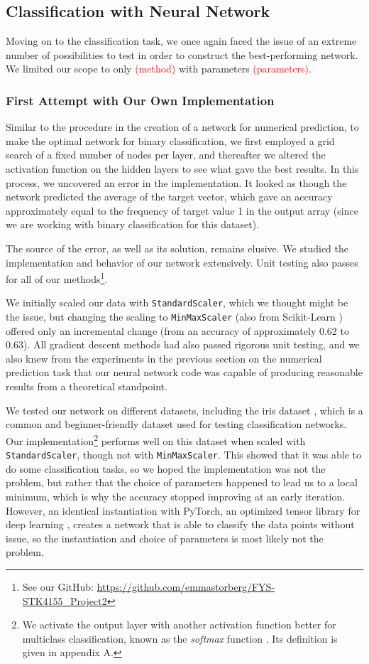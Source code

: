 \subsection{Classification with Neural Network}
Moving on to the classification task, we once again faced the issue of an extreme number of possibilities to test in order to construct the best-performing network. We limited our scope to only \textcolor{red}{(method)} with parameters \textcolor{red}{(parameters)}.

\subsubsection{First Attempt with Our Own Implementation}
Similar to the procedure in the creation of a network for numerical prediction, to make the optimal network for binary classification, we first employed a grid search of a fixed number of nodes per layer, and thereafter we altered the activation function on the hidden layers to see what gave the best results. In this process, we uncovered an error in the implementation. It looked as though the network predicted the average of the target vector, which gave an accuracy approximately equal to the frequency of target value 1 in the output array (since we are working with binary classification for this dataset). 

The source of the error, as well as its solution, remains elusive. We studied the implementation and behavior of our network extensively. Unit testing also passes for all of our methods\footnote{See our GitHub: \url{https://github.com/emmastorberg/FYS-STK4155_Project2}}.  

We initially scaled our data with \texttt{StandardScaler}, which we thought might be the issue, but changing the scaling to \texttt{MinMaxScaler} (also from Scikit-Learn \cite{sklearnScaling}) offered only an incremental change (from an accuracy of approximately 0.62 to 0.63). All gradient descent methods had also passed rigorous unit testing, and we also knew from the experiments in the previous section on the numerical prediction task that our neural network code was capable of producing reasonable results from a theoretical standpoint. 

We tested our network on different datasets, including the iris dataset \cite{irisdataset}, which is a common and beginner-friendly dataset used for testing classification networks. Our implementation\footnote{We activate the output layer with another activation function better for multiclass classification, known as the \emph{softmax} function \cite{softmax}. Its definition is given in appendix A.} performs well on this dataset when scaled with \texttt{StandardScaler}, though not with \texttt{MinMaxScaler}. This showed that it was able to do some classification tasks, so we hoped the implementation was not the problem, but rather that the choice of parameters happened to lead us to a local minimum, which is why the accuracy stopped improving at an early iteration. However, an identical instantiation with PyTorch, an optimized tensor library for deep learning \cite{pytorch}, creates a network that is able to classify the data points without issue, so the instantiation and choice of parameters is most likely not the problem.


